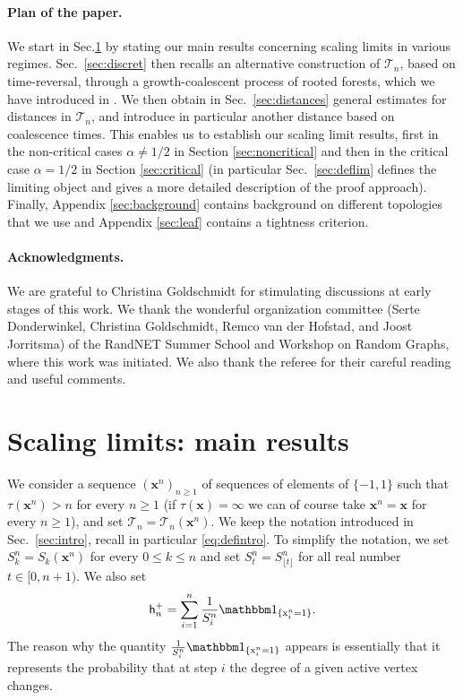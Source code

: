 \documentclass[11pt]{article}
\theoremstyle{plain}
\theoremstyle{definition}
\theoremstyle{remark}
\newcommand{\1}{\mathbbm{1}} %
\newcommand{\T}{\mathcal{T}} %
\newcommand{\h}{\mathsf{h}} %
\newcommand{\Xb}{\mathrm{\mathbf{x}}} %
\newcommand{\X}{\mathrm x} %
\begin{document}
\paragraph{Plan of the paper.} We start in Sec.\ref{sec:results} by stating our main results concerning scaling limits in various regimes.  Sec.~\ref{sec:discret} then recalls 
an alternative construction of $\T_{n}$, based on time-reversal, through a growth-coalescent process of rooted forests, which we have introduced in \cite{BBKK23+}. We then obtain in Sec.~\ref{sec:distances} general estimates for distances in $\T_{n}$, and introduce in particular another distance based on coalescence times. This enables us to establish our scaling limit results, first in the non-critical cases $\alpha \neq 1/2$ in Section \ref{sec:noncritical} and then in the critical case $\alpha=1/2$ in Section \ref{sec:critical} {(in particular Sec.~\ref{sec:deflim} defines the limiting object and gives a more detailed description of the proof approach)}. Finally, Appendix \ref{sec:background} contains background on different topologies that we use and Appendix \ref{sec:leaf} contains a tightness criterion.

\paragraph{Acknowledgments.} We are grateful to Christina Goldschmidt for stimulating discussions at early stages of this work. We thank the wonderful organization committee (Serte Donderwinkel, Christina Goldschmidt, Remco van der Hofstad, and Joost Jorritsma) of the RandNET Summer School and Workshop on Random Graphs, where this work was initiated.  {We also thank the referee for their careful reading and useful comments.}



\section{Scaling limits: main results}
\label{sec:results}


We consider a sequence $(\Xb^n)_{n \geq 1}$ of sequences of elements of $\{-1,1\}$ such that $\tau(\Xb^n)>n$ for every $n \geq 1$ (if $\tau(\Xb)=\infty$ we can of course take $\Xb^{n}=\Xb$ for every $n \geq 1$), and set $\T_{n}=\T_{n}(\Xb^{n})$. We keep the notation introduced in Sec.~\ref{sec:intro}, recall in particular \eqref{eq:defintro}. To simplify the notation, we set $S_k^n = S_k(\Xb^n)$ for every  $0 \leq  k\leq n$ and set $S_{t}^{n} = S_{\lfloor t \rfloor}^n $ for all real number $t \in [0,n+1)$.
We also set
\[ \h_n^+=\sum_{i=1}^n \frac{1}{S^{n}_i} \mathbbm 1_{\{\X^{n}_i=1\}}.\]
{The reason why the quantity $ \frac{1}{S^{n}_i} \mathbbm 1_{\{\X^{n}_i=1\}}$ appears is essentially that it represents the probability that at step $i$ the degree of a given active vertex changes.}
\end{document}
